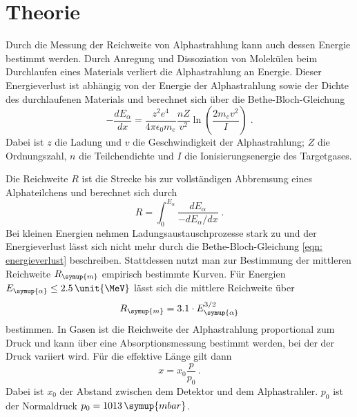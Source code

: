 \section{Theorie}
\label{sec:Theorie}

Durch die Messung der Reichweite von Alphastrahlung kann auch dessen
Energie bestimmt werden. Durch Anregung und Dissoziation von Molekülen beim 
Durchlaufen eines Materials verliert die Alphastrahlung an Energie. Dieser
Energieverlust ist abhängig von der Energie der Alphastrahlung sowie der
Dichte des durchlaufenen Materials und berechnet sich über die Bethe-Bloch-Gleichung
\begin{equation}
    -\frac{d E_\alpha}{d x}=\frac{z^2 e^4}{4 \pi \epsilon_0 m_e} \frac{n Z}{v^2} \ln \left(\frac{2 m_e v^2}{I}\right) \; .
    \label{eqn: energieverlust}
\end{equation}
Dabei ist $z$ die Ladung und $v$ die Geschwindigkeit der Alphastrahlung; $Z$ die Ordnungszahl,
$n$ die Teilchendichte und $I$ die Ionisierungsenergie des Targetgases. 

Die Reichweite $R$ ist die Strecke bis zur vollständigen Abbremsung eines 
Alphateilchens und berechnet sich durch 
\begin{equation*}
    R=\int_0^{E_\alpha} \frac{d E_\alpha}{-d E_\alpha / d x} \; .
\end{equation*}
Bei kleinen Energien nehmen Ladungsaustauschprozesse stark zu und der
Energieverlust lässt sich nicht mehr durch die Bethe-Bloch-Gleichung 
\eqref{eqn: energieverlust} beschreiben. Stattdessen nutzt man zur Bestimmung
der mittleren Reichweite $R_{\symup{m}}$ empirisch bestimmte Kurven. Für 
Energien $E_{\symup{\alpha}} \leq 2.5 \, \unit{\MeV}$ lässt sich die mittlere 
Reichweite über 
\begin{equation}
    R_{\symup{m}} = 3.1 \cdot E_{\symup{\alpha}}^{3/2}
    \label{eqn:R_m}
\end{equation}
bestimmen.
In Gasen ist die Reichweite der Alphastrahlung proportional zum Druck und kann
über eine Absorptionsmessung bestimmt werden, bei der der Druck variiert wird.
Für die effektive Länge gilt dann 
\begin{equation}
    x = x_0 \frac{p}{p_0} \, .
    \label{eqn:effLaeng}
\end{equation}
Dabei ist $x_0$ der Abstand zwischen dem Detektor und dem Alphastrahler. 
$p_0$ ist der Normaldruck $p_0 = 1013 \, \symup{mbar}$.